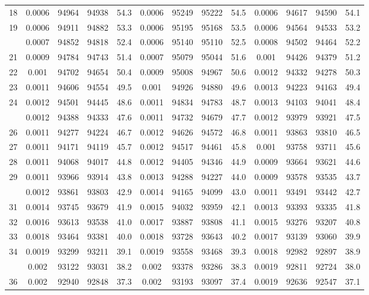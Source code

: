 \documentclass[
  14pt,
]{article}
\begin{document}
\begin{longtable}[t]{lcccccccccccc}
18 & 0.0006 & 94964 & 94938 & 54.3 & 0.0006 & 95249 & 95222 & 54.5 & 0.0006 & 94617 & 94590 & 54.1\\
19 & 0.0006 & 94911 & 94882 & 53.3 & 0.0006 & 95195 & 95168 & 53.5 & 0.0006 & 94564 & 94533 & 53.2\\
\addlinespace
20 & 0.0007 & 94852 & 94818 & 52.4 & 0.0006 & 95140 & 95110 & 52.5 & 0.0008 & 94502 & 94464 & 52.2\\
21 & 0.0009 & 94784 & 94743 & 51.4 & 0.0007 & 95079 & 95044 & 51.6 & 0.001 & 94426 & 94379 & 51.2\\
22 & 0.001 & 94702 & 94654 & 50.4 & 0.0009 & 95008 & 94967 & 50.6 & 0.0012 & 94332 & 94278 & 50.3\\
23 & 0.0011 & 94606 & 94554 & 49.5 & 0.001 & 94926 & 94880 & 49.6 & 0.0013 & 94223 & 94163 & 49.4\\
24 & 0.0012 & 94501 & 94445 & 48.6 & 0.0011 & 94834 & 94783 & 48.7 & 0.0013 & 94103 & 94041 & 48.4\\
\addlinespace
25 & 0.0012 & 94388 & 94333 & 47.6 & 0.0011 & 94732 & 94679 & 47.7 & 0.0012 & 93979 & 93921 & 47.5\\
26 & 0.0011 & 94277 & 94224 & 46.7 & 0.0012 & 94626 & 94572 & 46.8 & 0.0011 & 93863 & 93810 & 46.5\\
27 & 0.0011 & 94171 & 94119 & 45.7 & 0.0012 & 94517 & 94461 & 45.8 & 0.001 & 93758 & 93711 & 45.6\\
28 & 0.0011 & 94068 & 94017 & 44.8 & 0.0012 & 94405 & 94346 & 44.9 & 0.0009 & 93664 & 93621 & 44.6\\
29 & 0.0011 & 93966 & 93914 & 43.8 & 0.0013 & 94288 & 94227 & 44.0 & 0.0009 & 93578 & 93535 & 43.7\\
\addlinespace
30 & 0.0012 & 93861 & 93803 & 42.9 & 0.0014 & 94165 & 94099 & 43.0 & 0.0011 & 93491 & 93442 & 42.7\\
31 & 0.0014 & 93745 & 93679 & 41.9 & 0.0015 & 94032 & 93959 & 42.1 & 0.0013 & 93393 & 93335 & 41.8\\
32 & 0.0016 & 93613 & 93538 & 41.0 & 0.0017 & 93887 & 93808 & 41.1 & 0.0015 & 93276 & 93207 & 40.8\\
33 & 0.0018 & 93464 & 93381 & 40.0 & 0.0018 & 93728 & 93643 & 40.2 & 0.0017 & 93139 & 93060 & 39.9\\
34 & 0.0019 & 93299 & 93211 & 39.1 & 0.0019 & 93558 & 93468 & 39.3 & 0.0018 & 92982 & 92897 & 38.9\\
\addlinespace
35 & 0.002 & 93122 & 93031 & 38.2 & 0.002 & 93378 & 93286 & 38.3 & 0.0019 & 92811 & 92724 & 38.0\\
36 & 0.002 & 92940 & 92848 & 37.3 & 0.002 & 93193 & 93097 & 37.4 & 0.0019 & 92636 & 92547 & 37.1\\

\end{longtable}
\end{document}
